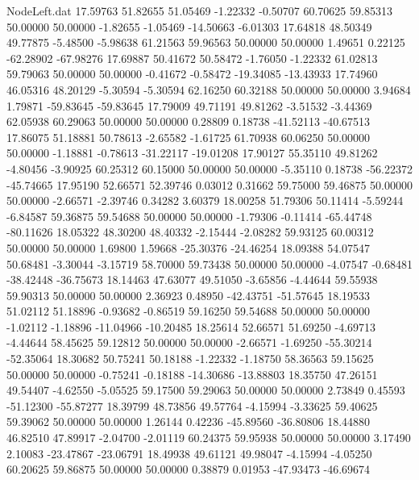 \begin{filecontents}{NodeLeft.dat}
  17.59763   51.82655   51.05469    -1.22332   -0.50707   60.70625   59.85313   50.00000   50.00000   -1.82655   -1.05469  -14.50663   -6.01303
  17.64818   48.50349   49.77875    -5.48500   -5.98638   61.21563   59.96563   50.00000   50.00000    1.49651    0.22125  -62.28902  -67.98276
  17.69887   50.41672   50.58472    -1.76050   -1.22332   61.02813   59.79063   50.00000   50.00000   -0.41672   -0.58472  -19.34085  -13.43933
  17.74960   46.05316   48.20129    -5.30594   -5.30594   62.16250   60.32188   50.00000   50.00000    3.94684    1.79871  -59.83645  -59.83645
  17.79009   49.71191   49.81262    -3.51532   -3.44369   62.05938   60.29063   50.00000   50.00000    0.28809    0.18738  -41.52113  -40.67513
  17.86075   51.18881   50.78613    -2.65582   -1.61725   61.70938   60.06250   50.00000   50.00000   -1.18881   -0.78613  -31.22117  -19.01208
  17.90127   55.35110   49.81262    -4.80456   -3.90925   60.25312   60.15000   50.00000   50.00000   -5.35110    0.18738  -56.22372  -45.74665
  17.95190   52.66571   52.39746     0.03012    0.31662   59.75000   59.46875   50.00000   50.00000   -2.66571   -2.39746    0.34282    3.60379
  18.00258   51.79306   50.11414    -5.59244   -6.84587   59.36875   59.54688   50.00000   50.00000   -1.79306   -0.11414  -65.44748  -80.11626
  18.05322   48.30200   48.40332    -2.15444   -2.08282   59.93125   60.00312   50.00000   50.00000    1.69800    1.59668  -25.30376  -24.46254
  18.09388   54.07547   50.68481    -3.30044   -3.15719   58.70000   59.73438   50.00000   50.00000   -4.07547   -0.68481  -38.42448  -36.75673
  18.14463   47.63077   49.51050    -3.65856   -4.44644   59.55938   59.90313   50.00000   50.00000    2.36923    0.48950  -42.43751  -51.57645
  18.19533   51.02112   51.18896    -0.93682   -0.86519   59.16250   59.54688   50.00000   50.00000   -1.02112   -1.18896  -11.04966  -10.20485
  18.25614   52.66571   51.69250    -4.69713   -4.44644   58.45625   59.12812   50.00000   50.00000   -2.66571   -1.69250  -55.30214  -52.35064
  18.30682   50.75241   50.18188    -1.22332   -1.18750   58.36563   59.15625   50.00000   50.00000   -0.75241   -0.18188  -14.30686  -13.88803
  18.35750   47.26151   49.54407    -4.62550   -5.05525   59.17500   59.29063   50.00000   50.00000    2.73849    0.45593  -51.12300  -55.87277
  18.39799   48.73856   49.57764    -4.15994   -3.33625   59.40625   59.39062   50.00000   50.00000    1.26144    0.42236  -45.89560  -36.80806
  18.44880   46.82510   47.89917    -2.04700   -2.01119   60.24375   59.95938   50.00000   50.00000    3.17490    2.10083  -23.47867  -23.06791
  18.49938   49.61121   49.98047    -4.15994   -4.05250   60.20625   59.86875   50.00000   50.00000    0.38879    0.01953  -47.93473  -46.69674

\end{filecontents}
